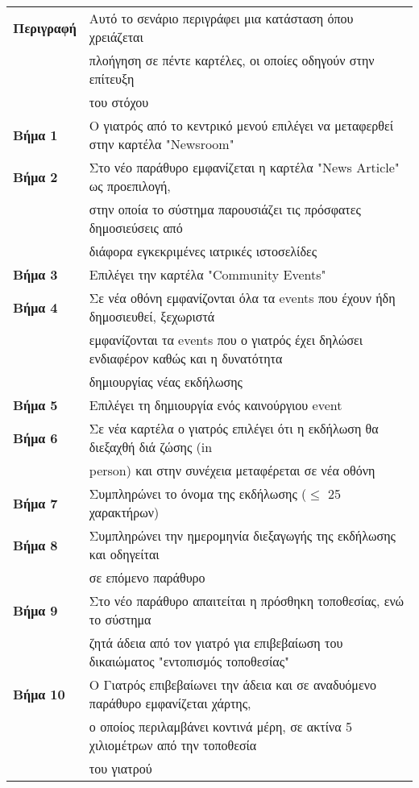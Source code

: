 \documentclass{article}
\newcommand\T{\rule{0pt}{2.6ex}}       %
\newcommand\B{\rule[-1.2ex]{0pt}{0pt}}
\begin{document}
 \begin{center}
     \begin{tabular}{|l|l|}
     \hline
      \textbf{Περιγραφή} & Αυτό το σενάριο περιγράφει μια κατάσταση όπου χρειάζεται \T \\& πλοήγηση σε πέντε καρτέλες, οι οποίες οδηγούν στην επίτευξη \\& του στόχου \B \\ 
      \hline
      \textbf{Βήμα 1} & Ο γιατρός από το κεντρικό μενού επιλέγει να μεταφερθεί στην καρτέλα "Newsroom" \T\B \\
      \hline
      \textbf{Βήμα 2} & Στο νέο παράθυρο εμφανίζεται η καρτέλα "News Article" ως προεπιλογή, \T \\& στην οποία το σύστημα παρουσιάζει τις πρόσφατες δημοσιεύσεις από \\& διάφορα εγκεκριμένες ιατρικές ιστοσελίδες \B \\
      \hline
      \textbf{Βήμα 3} & Επιλέγει την καρτέλα "Community Events" \T\B \\
      \hline
      \textbf{Βήμα 4} & Σε νέα οθόνη εμφανίζονται όλα τα events που έχουν ήδη δημοσιευθεί, ξεχωριστά\T \\ & εμφανίζονται τα events που ο γιατρός έχει δηλώσει ενδιαφέρον καθώς  και η δυνατότητα \\& δημιουργίας νέας εκδήλωσης\B \\
      \hline
      \textbf{Βήμα 5} & Επιλέγει τη δημιουργία ενός καινούργιου event \T\B \\
      \hline
      \textbf{Βήμα 6} & Σε νέα καρτέλα ο γιατρός επιλέγει ότι η εκδήλωση θα διεξαχθή διά ζώσης (in \T \\& person) και στην συνέχεια μεταφέρεται σε νέα οθόνη \B\\
      \hline
      \textbf{Βήμα 7} & Συμπληρώνει το όνομα της εκδήλωσης ($\le$ 25 χαρακτήρων) \T\B \\
      \hline
      \textbf{Βήμα 8} & Συμπληρώνει την ημερομηνία διεξαγωγής της εκδήλωσης και οδηγείται \T \\& σε επόμενο παράθυρο \B \\
      \hline
      \textbf{Βήμα 9} & Στο νέο παράθυρο απαιτείται η πρόσθηκη τοποθεσίας, ενώ το σύστημα \T \\& ζητά άδεια από τον γιατρό για επιβεβαίωση του δικαιώματος "εντοπισμός τοποθεσίας" \B \\
      \hline
       \textbf{Βήμα 10} & Ο Γιατρός επιβεβαίωνει την άδεια και σε αναδυόμενο παράθυρο εμφανίζεται χάρτης, \T \\& ο οποίος περιλαμβάνει κοντινά μέρη, σε ακτίνα 5 χιλιομέτρων από την τοποθεσία \\& του γιατρού \B \\

\end{tabular}
\end{center}
\end{document}
